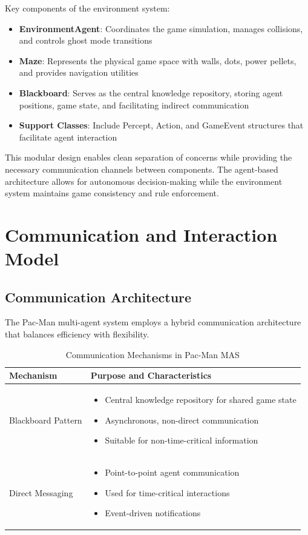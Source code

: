 \documentclass[a4paper, 11pt]{article}
\begin{document}
Key components of the environment system:
\begin{itemize}
    \item \textbf{EnvironmentAgent}: Coordinates the game simulation, manages collisions, and controls ghost mode transitions
    \item \textbf{Maze}: Represents the physical game space with walls, dots, power pellets, and provides navigation utilities
    \item \textbf{Blackboard}: Serves as the central knowledge repository, storing agent positions, game state, and facilitating indirect communication
    \item \textbf{Support Classes}: Include Percept, Action, and GameEvent structures that facilitate agent interaction
\end{itemize}

This modular design enables clean separation of concerns while providing the necessary communication channels between components. The agent-based architecture allows for autonomous decision-making while the environment system maintains game consistency and rule enforcement.

\section{Communication and Interaction Model}

\subsection{Communication Architecture}
The Pac-Man multi-agent system employs a hybrid communication architecture that balances efficiency with flexibility.

\begin{table}[h]
\centering
\caption{Communication Mechanisms in Pac-Man MAS}
\begin{tabular}{|p{3.5cm}|p{10.5cm}|}
\hline
\textbf{Mechanism} & \textbf{Purpose and Characteristics} \\
\hline
Blackboard Pattern & 
\begin{itemize}
    \item Central knowledge repository for shared game state
    \item Asynchronous, non-direct communication
    \item Suitable for non-time-critical information
\end{itemize} \\
\hline
Direct Messaging & 
\begin{itemize}
    \item Point-to-point agent communication
    \item Used for time-critical interactions
    \item Event-driven notifications
\end{itemize} \\
\hline
\end{tabular}
\end{table}
\end{document}
